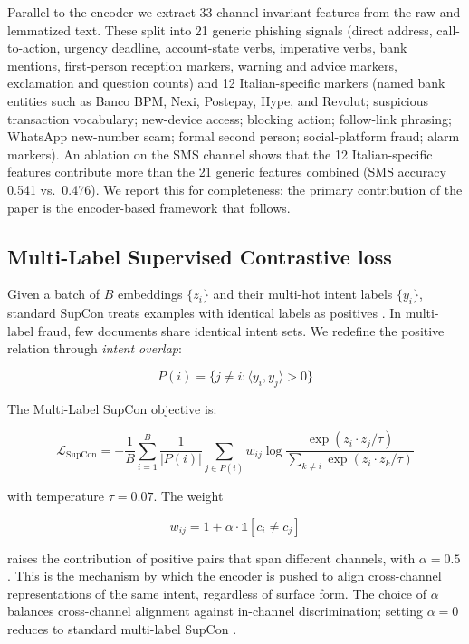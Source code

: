 \documentclass[preprint,12pt,authoryear]{elsarticle}
\begin{document}
Parallel to the encoder we extract 33 channel-invariant features from
the raw and lemmatized text. These split into 21 generic phishing
signals (direct address, call-to-action, urgency deadline,
account-state verbs, imperative verbs, bank mentions, first-person
reception markers, warning and advice markers, exclamation and
question counts) and 12 Italian-specific markers (named bank entities
such as Banco BPM, Nexi, Postepay, Hype, and Revolut; suspicious
transaction vocabulary; new-device access; blocking action;
follow-link phrasing; WhatsApp new-number scam; formal second person;
social-platform fraud; alarm markers). An ablation on the SMS
channel shows that the 12 Italian-specific features contribute more
than the 21 generic features combined (SMS accuracy 0.541 vs.\
0.476). We report this for completeness; the primary contribution
of the paper is the encoder-based framework that follows.

\subsection{Multi-Label Supervised Contrastive loss}

Given a batch of $B$ embeddings $\{z_i\}$ and their multi-hot intent
labels $\{y_i\}$, standard SupCon treats examples with identical
labels as positives \citep{khosla2020supcon}. In multi-label fraud,
few documents share identical intent sets. We redefine the positive
relation through \emph{intent overlap}:

\begin{equation}
P(i) = \{j \neq i : \langle y_i, y_j \rangle > 0\}
\end{equation}

The Multi-Label SupCon objective is:

\begin{equation}
\mathcal{L}_{\text{SupCon}} =
-\frac{1}{B} \sum_{i=1}^{B} \frac{1}{|P(i)|}
\sum_{j \in P(i)} w_{ij}
\log \frac{\exp(z_i \cdot z_j / \tau)}
{\sum_{k \neq i} \exp(z_i \cdot z_k / \tau)}
\label{eq:supcon}
\end{equation}

with temperature $\tau = 0.07$. The weight

\begin{equation}
w_{ij} = 1 + \alpha \cdot \mathbb{1}[c_i \neq c_j]
\label{eq:weight}
\end{equation}

raises the contribution of positive pairs that span different
channels, with $\alpha = 0.5$. This is the mechanism by which the
encoder is pushed to align cross-channel representations of the same
intent, regardless of surface form. The choice of $\alpha$ balances
cross-channel alignment against in-channel discrimination; setting
$\alpha = 0$ reduces to standard multi-label SupCon
\citep{audibert2025multilabel}.
\end{document}
